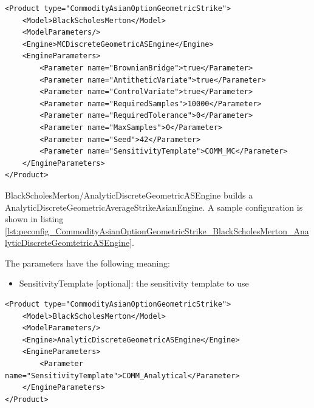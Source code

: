 \begin{longlisting}
\begin{verbatim}
<Product type="CommodityAsianOptionGeometricStrike">
    <Model>BlackScholesMerton</Model>
    <ModelParameters/>
    <Engine>MCDiscreteGeometricASEngine</Engine>
    <EngineParameters>
        <Parameter name="BrownianBridge">true</Parameter>
        <Parameter name="AntitheticVariate">true</Parameter>
        <Parameter name="ControlVariate">true</Parameter>
        <Parameter name="RequiredSamples">10000</Parameter>
        <Parameter name="RequiredTolerance">0</Parameter>
        <Parameter name="MaxSamples">0</Parameter>
        <Parameter name="Seed">42</Parameter>
        <Parameter name="SensitivityTemplate">COMM_MC</Parameter>
    </EngineParameters>
</Product>
\end{verbatim}
\caption{Configuration for Product CommodityAsianOptionGeometricStrike, Model BlackScholesMerton, Engine MCDiscreteGeometricASEngine}
\label{lst:peconfig_CommodityAsianOptionGeometricStrike_BlackScholesMerton_MCDiscreteGeomtetricASEngine}
\end{longlisting}

BlackScholesMerton/AnalyticDiscreteGeometricASEngine builds a AnalyticDiscreteGeometricAverageStrikeAsianEngine. A sample
configuration is shown in listing
\ref{lst:peconfig_CommodityAsianOptionGeometricStrike_BlackScholesMerton_AnalyticDiscreteGeomtetricASEngine}.

The parameters have the following meaning:

\begin{itemize}
\item SensitivityTemplate [optional]: the sensitivity template to use
\end{itemize}

\begin{longlisting}
\begin{verbatim}
<Product type="CommodityAsianOptionGeometricStrike">
    <Model>BlackScholesMerton</Model>
    <ModelParameters/>
    <Engine>AnalyticDiscreteGeometricASEngine</Engine>
    <EngineParameters>
        <Parameter name="SensitivityTemplate">COMM_Analytical</Parameter>
    </EngineParameters>
</Product>
\end{verbatim}
\caption{Configuration for Product CommodityAsianOptionGeometricStrike, Model BlackScholesMerton, Engine AnalyticDiscreteGeomtetricASEngine}
\label{lst:peconfig_CommodityAsianOptionGeometricStrike_BlackScholesMerton_AnalyticDiscreteGeomtetricASEngine}
\end{longlisting}

